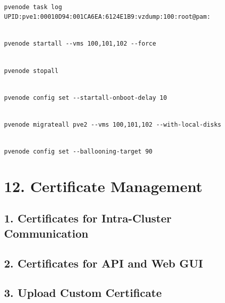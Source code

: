 \begin{lstlisting}

pvenode task log UPID:pve1:00010D94:001CA6EA:6124E1B9:vzdump:100:root@pam:

\end{lstlisting}

\begin{lstlisting}

pvenode startall --vms 100,101,102 --force

\end{lstlisting}

\begin{lstlisting}

pvenode stopall

\end{lstlisting}

\begin{lstlisting}

pvenode config set --startall-onboot-delay 10

\end{lstlisting}

\begin{lstlisting}

pvenode migrateall pve2 --vms 100,101,102 --with-local-disks

\end{lstlisting}

\begin{lstlisting}

pvenode config set --ballooning-target 90

\end{lstlisting}


\section{12. Certificate Management}

\subsection{1. Certificates for Intra-Cluster Communication}

\subsection{2. Certificates for API and Web GUI}

\subsection{3. Upload Custom Certificate}

